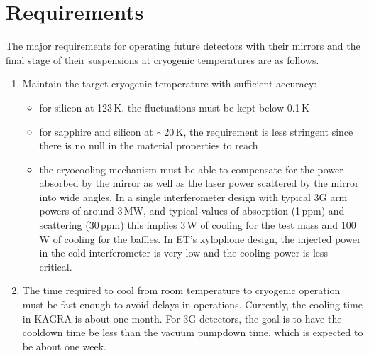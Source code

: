 \section{Requirements}
The major requirements for operating future detectors with their mirrors and the final stage of their suspensions at cryogenic temperatures are as follows. 
\begin{enumerate}
\item Maintain the target cryogenic temperature with sufficient accuracy:
      \begin{itemize}
        \item for silicon at 123\,K, the fluctuations must be kept below 0.1\,K
        \item for sapphire and silicon at $\sim$20\,K, the requirement is less stringent since there is no null in the material properties to reach
        \item the cryocooling mechanism must be able to compensate for the power absorbed by the mirror as well as the laser power scattered by the mirror into wide angles. In a single interferometer design with typical 3G arm powers of around 3\,MW, and typical values of absorption (1\,ppm) and scattering (30\,ppm) this implies 3\,W of cooling for the test mass and 100\,W of cooling for the baffles. In ET's xylophone design, the injected power in the cold interferometer is very low and the cooling power is less critical. 
      \end{itemize}

\item The time required to cool from room temperature to cryogenic operation must be fast enough to avoid delays in operations. Currently, the cooling time in KAGRA is about one month. For 3G detectors, the goal is to have the cooldown time be less than the vacuum pumpdown time, which is expected to be about one week.  



\end{enumerate}

